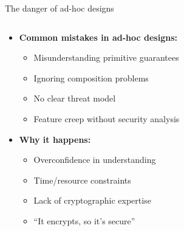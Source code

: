 \documentclass[aspectratio=169, lualatex, handout]{beamer}
\begin{document}
\begin{frame}{The danger of ad-hoc designs}
	\begin{columns}[c]
		\begin{column}{1\textwidth}
			\begin{itemize}
				\item \textbf{Common mistakes in ad-hoc designs:}
				      \begin{itemize}
					      \item Misunderstanding primitive guarantees
					      \item Ignoring composition problems
					      \item No clear threat model
					      \item Feature creep without security analysis
				      \end{itemize}
				\item \textbf{Why it happens:}
				      \begin{itemize}
					      \item Overconfidence in understanding
					      \item Time/resource constraints
					      \item Lack of cryptographic expertise
					      \item ``It encrypts, so it's secure''
				      \end{itemize}
			\end{itemize}
		\end{column}
	\end{columns}
\end{frame}
\end{document}
